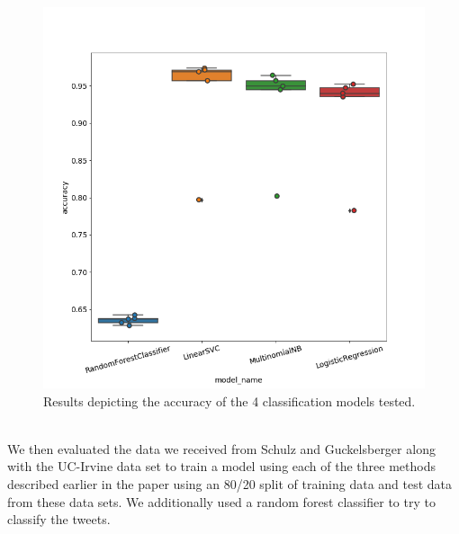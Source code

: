 \documentclass[titlepage, 12pt]{article}
\begin{document}
\begin{figure}[h!]
\centering
\includegraphics[scale=0.5]{pics/results_large_text.png}
\caption{Results depicting the accuracy of the 4 classification models tested.}
\label{fig:model_results}
\end{figure}\\

\hspace{0.5 cm}We then evaluated the data we received from Schulz and Guckelsberger \citep{CT.2015} along with the UC-Irvine data set \citep{UCI.2016} to train a model using each of the three methods described earlier in the paper using an 80/20 split of training data and test data from these data sets. We additionally used a random forest classifier to try to classify the tweets.\\
\end{document}
